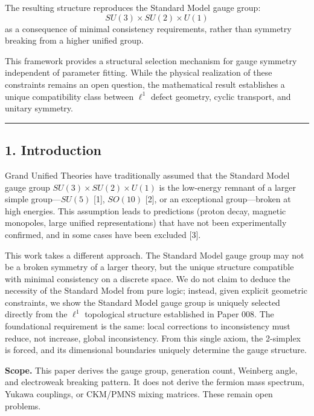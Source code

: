 \documentclass[
]{article}
\begin{document}
The resulting structure reproduces the Standard Model gauge group:
\[SU(3) \times SU(2) \times U(1)\] as a consequence of minimal
consistency requirements, rather than symmetry breaking from a higher
unified group.

This framework provides a structural selection mechanism for gauge
symmetry independent of parameter fitting. While the physical
realization of these constraints remains an open question, the
mathematical result establishes a unique compatibility class between
\(\ell^1\) defect geometry, cyclic transport, and unitary symmetry.

\begin{center}\rule{0.5\linewidth}{0.5pt}\end{center}

\hypertarget{introduction}{%
\subsection{1. Introduction}\label{introduction}}

Grand Unified Theories have traditionally assumed that the Standard
Model gauge group \(SU(3) \times SU(2) \times U(1)\) is the low-energy
remnant of a larger simple group---\(SU(5)\) {[}1{]}, \(SO(10)\)
{[}2{]}, or an exceptional group---broken at high energies. This
assumption leads to predictions (proton decay, magnetic monopoles, large
unified representations) that have not been experimentally confirmed,
and in some cases have been excluded {[}3{]}.

This work takes a different approach. The Standard Model gauge group may
not be a broken symmetry of a larger theory, but the unique structure
compatible with minimal consistency on a discrete space. We do not claim
to deduce the necessity of the Standard Model from pure logic; instead,
given explicit geometric constraints, we show the Standard Model gauge
group is uniquely selected directly from the \(\ell^1\) topological
structure established in Paper 008. The foundational requirement is the
same: local corrections to inconsistency must reduce, not increase,
global inconsistency. From this single axiom, the 2-simplex is forced,
and its dimensional boundaries uniquely determine the gauge structure.

\textbf{Scope.} This paper derives the gauge group, generation count,
Weinberg angle, and electroweak breaking pattern. It does not derive the
fermion mass spectrum, Yukawa couplings, or CKM/PMNS mixing matrices.
These remain open problems.
\end{document}
